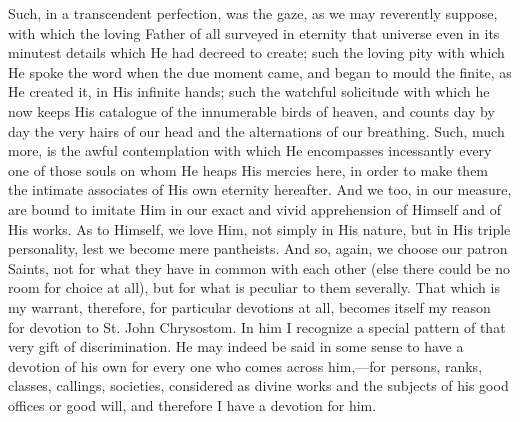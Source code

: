 Such, in a transcendent perfection, was the gaze, as we may
reverently suppose, with which the loving Father of all surveyed in
eternity that universe even in its minutest details which He had
decreed to create; such the loving pity with which He spoke the word
when the due moment came, and began to mould the finite, as He created
it, in His infinite hands; such the watchful solicitude with which he
now keeps His catalogue of the innumerable birds of heaven, and counts
day by day the very hairs of our head and the alternations of our
breathing. Such, much more, is the awful contemplation with which He
encompasses incessantly every one of those souls on whom He heaps His
mercies here, in order to make them the intimate associates of His own
eternity hereafter. And we too, in our measure, are bound to imitate
Him in our exact and vivid apprehension of Himself and of His works.
As to Himself, we love Him, not simply in His nature, but in His
triple personality, lest we become mere pantheists. And so, again, we
choose our patron Saints, not for what they have in common with each
other (else there could be no room for choice at all), but for what is
peculiar to them severally. That which is my warrant, therefore, for
particular devotions at all, becomes itself my reason for devotion to
St. John Chrysostom. In him I recognize a special pattern of that very
gift of discrimination. He may indeed be said in some sense to have a
devotion of his own for every one who comes across him,—for persons,
ranks, classes, callings, societies, considered as divine works and
the subjects of his good offices or good will, and therefore I
have a devotion for him.

